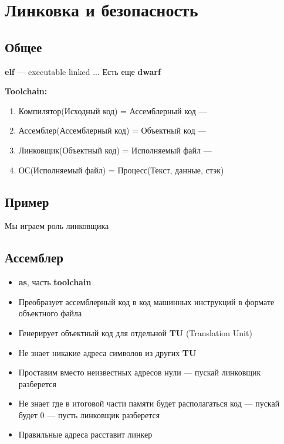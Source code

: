 \documentclass[../../lectures.tex]{subfiles}
\begin{document}
\chapter{Линковка и безопасность}

\section{Общее}
\textbf{elf} --- executable linked ... 
Есть еще \textbf{dwarf}

\textbf{Toolchain:}
\begin{enumerate}
    \item Компилятор(Исходный код) = Ассемблерный код --- 
    \item Ассемблер(Ассемблерный код) = Объектный код --- 
    \item Линковщик(Объектный код) = Исполняемый файл --- 
    \item ОС(Исполняемый файл) = Процесс(Текст, данные, стэк)
\end{enumerate}

\section{Пример}
Мы играем роль линковщика

\section{Ассемблер}
\begin{itemize}
    \item \textbf{as}, часть \textbf{toolchain}
    \item Преобразует ассемблерный код в код машинных инструкций в формате объектного файла
    \item Генерирует объектный код для отдельной \textbf{TU} (Translation Unit)
    \item Не знает никакие адреса символов из других \textbf{TU}
    \item Проставим вместо неизвестных адресов нули --- пускай линковщик разберется
    \item Не знает где в итоговой части памяти будет располагаться код --- пускай будет 0 --- пусть линковщик разберется
    \item Правильные адреса расставит линкер
\end{itemize}
\end{document}

